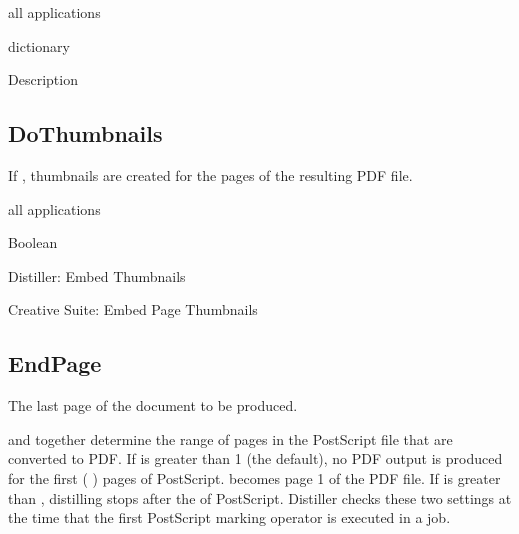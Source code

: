 \documentclass[letterpaper,12pt,english,openany,oneside]{sphinxmanual}
\begin{document}
\label{\detokenize{PDF_Create_CommonSettings:supported-by-6}}

all applications

\label{\detokenize{PDF_Create_CommonSettings:type-6}}

dictionary

\label{\detokenize{PDF_Create_CommonSettings:ui-name-5}}

Description




\subsection{DoThumbnails}
\label{\detokenize{PDF_Create_CommonSettings:dothumbnails}}
If  , thumbnails are created for the pages of the resulting PDF file.

\label{\detokenize{PDF_Create_CommonSettings:supported-by-7}}

all applications

\label{\detokenize{PDF_Create_CommonSettings:type-7}}

Boolean

\label{\detokenize{PDF_Create_CommonSettings:ui-name-6}}

\begin{DUlineblock}{0em}
\item[] Distiller: Embed Thumbnails
\item[] Creative Suite: Embed Page Thumbnails
\end{DUlineblock}
\label{\detokenize{PDF_Create_CommonSettings:default-value-6}}

\begin{sphinxVerbatim}[commandchars=\\\{\}]
\end{sphinxVerbatim}


\subsection{EndPage}
\label{\detokenize{PDF_Create_CommonSettings:endpage}}
The last page of the document to be produced.

 and  together determine the range of pages in the PostScript file that are converted to PDF. If  is greater than 1 (the default), no PDF output is produced for the first (  ) pages of PostScript.  becomes page 1 of the PDF file. If  is greater than  , distilling stops after the  of PostScript. Distiller checks these two settings at the time that the first PostScript marking operator is executed in a job.
\end{document}
